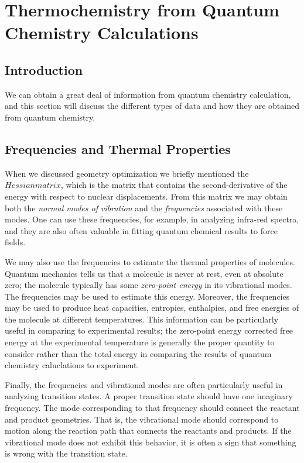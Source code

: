 \chapter{Thermochemistry from Quantum Chemistry Calculations}
\label{chap-thermochem}

\section{Introduction}
We can obtain a great deal of information from quantum chemistry
calculation, and this section will discuss the different types of
data and how they are obtained from quantum chemistry.

\section{Frequencies and Thermal Properties}

When we discussed geometry optimization we briefly mentioned the
$Hessian matrix$, which is the matrix that contains the
second-derivative of the energy with respect to nuclear
displacements. From this matrix we may obtain both the \emph{normal
modes of vibration} and the \emph{frequencies} associated with these
modes. One can use these frequencies, for example, in analyzing
infra-red spectra, and they are also often valuable in fitting quantum
chemical results to force fields. 

We may also use the frequencies to estimate the thermal properties of
molecules. Quantum mechanics tells us that a molecule is never at
rest, even at absolute zero; the molecule typically has some
\emph{zero-point energy} in its vibrational modes. The frequencies may
be used to estimate this energy. Moreover, the frequencies may be used
to produce heat capacities, entropies, enthalpies, and free energies
of the molecule at different temperatures. This information can be
particularly useful in comparing to experimental results; the
zero-point energy corrected free energy at the experimental
temperature is generally the proper quantity to consider rather than
the total energy in comparing the results of quantum chemistry
caluclations to experiment.

Finally, the frequencies and vibrational modes are often
particularly useful in analyzing transition states. A proper
transition state should have one imaginary frequency. The mode
corresponding to that frequency should connect the reactant and
product geometries. That is, the vibrational mode should correspond to
motion along the reaction path that connects the reactants and
products. If the vibrational mode does not exhibit this behavior, it
is often a sign that something is wrong with the transition state.

